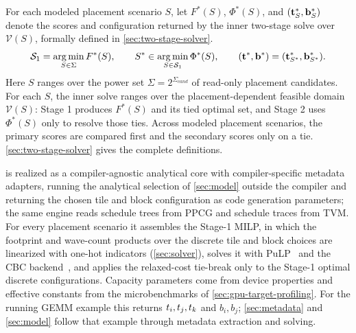 For each modeled placement scenario \(S\), let \(F^*(S)\), \(\Phi^*(S)\), and \((\mathbf{t}_S^*,\mathbf{b}_S^*)\) denote the scores and configuration returned by the inner two-stage solve over \(\mathcal{V}(S)\), formally defined in \autoref{sec:two-stage-solver}.
\begin{equation}
\mathcal{S}_1=\mathop{\arg\min}_{S\in\Sigma} F^*(S),\qquad
S^*\in \mathop{\arg\min}_{S\in\mathcal{S}_1} \Phi^*(S),\qquad
(\mathbf{t}^*,\mathbf{b}^*)=(\mathbf{t}_{S^*}^*,\mathbf{b}_{S^*}^*).
\label{eq:two-level}
\end{equation}
Here \(S\) ranges over the power set \(\Sigma=2^{\Sigma_{\mathit{cand}}}\) of read-only placement candidates. For each \(S\), the inner solve ranges over the placement-dependent feasible domain \(\mathcal{V}(S)\): Stage 1 produces \(F^*(S)\) and its tied optimal set, and Stage 2 uses \(\Phi^*(S)\) only to resolve those ties. Across modeled placement scenarios, the primary scores are compared first and the secondary scores only on a tie. \autoref{sec:two-stage-solver} gives the complete definitions. %

\name is realized as a compiler-agnostic analytical core with compiler-specific metadata adapters, running the analytical selection of \autoref{sec:model} outside the compiler and returning the chosen tile and block configuration as code generation parameters; the same engine reads schedule trees from PPCG and schedule traces from TVM. For every placement scenario it assembles the Stage-1 MILP, in which the footprint and wave-count products over the discrete tile and block choices are linearized with one-hot indicators (\autoref{sec:solver}), solves it with PuLP~\cite{pulp} and the CBC backend~\cite{cbc}, and applies the relaxed-cost tie-break only to the Stage-1 optimal discrete configurations. Capacity parameters come from device properties and effective constants from the microbenchmarks of \autoref{sec:gpu-target-profiling}. For the running GEMM example this returns \(t_i,t_j,t_k\) and \(b_i,b_j\); \autoref{sec:metadata} and \autoref{sec:model} follow that example through metadata extraction and solving.
